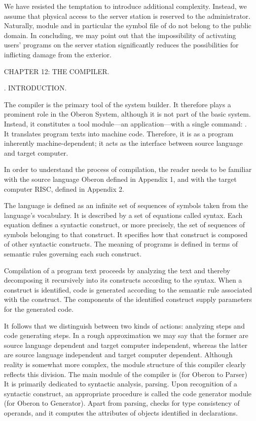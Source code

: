 We have resisted the temptation to introduce additional complexity. Instead, we assume that physical access to the server station is reserved to the administrator. Naturally, module  and in particular the symbol file of  do not belong to the public domain. In concluding, we may point out that the impossibility of activating users' programs on the server station significantly reduces the possibilities for inflicting damage from the exterior.

\beginchapter CHAPTER 12: THE COMPILER.

. INTRODUCTION.

The compiler is the primary tool of the system builder. It therefore plays a prominent role in the Oberon System, although it is not part of the basic system. Instead, it constitutes a tool module---an application---with a single command: . It translates program texts into machine code. Therefore, it is as a program inherently machine-dependent; it acts as the interface between source language and target computer.

In order to understand the process of compilation, the reader needs to be familiar with the source language Oberon defined in Appendix 1, and with the target computer RISC, defined in Appendix 2.

The language is defined as an infinite set of sequences of symbols taken from the language's vocabulary. It is described by a set of equations called syntax. Each equation defines a syntactic construct, or more precisely, the set of sequences of symbols belonging to that construct. It specifies how that construct is composed of other syntactic constructs. The meaning of programs is defined in terms of semantic rules governing each such construct.

Compilation of a program text proceeds by analyzing the text and thereby decomposing it recursively into its constructs according to the syntax. When a construct is identified, code is generated according to the semantic rule associated with the construct. The components of the identified construct supply parameters for the generated code.

It follows that we distinguish between two kinds of actions: analyzing steps and code generating steps. In a rough approximation we may say that the former are source language dependent and target computer independent, whereas the latter are source language independent and target computer dependent. Although reality is somewhat more complex, the module structure of this compiler clearly reflects this division. The main module of the compiler is  (for Oberon to \RISC Parser) It is primarily dedicated to syntactic analysis, parsing. Upon recognition of a syntactic construct, an appropriate procedure is called the code generator module  (for Oberon to \RISC Generator). Apart from parsing,  checks for type consistency of operands, and it computes the attributes of objects identified in declarations.

